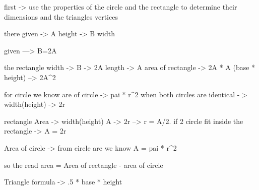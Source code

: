 first -> use the properties of the circle and the rectangle to determine their dimensions and the triangles vertices 

there given
-> A height 
-> B width 

given ---> B=2A

the rectangle
width -> B -> 2A
length -> A
area of rectangle -> 2A * A (base * height) --> 2A^2

for circle we know are of circle -> pai * r^2
when both circles are identical - > 
width(height) -> 2r

rectangle Area -> width(height) A -> 2r --> r = A/2.
if 2 circle fit inside the rectangle -> A = 2r

Area of circle -> from circle are we know A = pai * r^2

so the read area = Area of rectangle - area of circle 








Triangle formula -> .5 * base * height 



